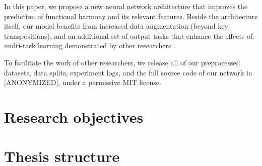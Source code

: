 In this paper, we propose a new neural network architecture that improves the prediction of functional harmony and its relevant features. 
Beside the architecture itself, our model benefits from increased data augmentation (beyond key transpositions), and an additional set of output tasks that enhance the effects of multi-task learning demonstrated by other researchers \cite{chen_functional_2018}.

To facilitate the work of other researchers, we release all of our preprocessed datasets, data splits, experiment logs, and the full source code of our network in [ANONYMIZED], under a permissive MIT license.


\section{Research objectives}


\section{Thesis structure}


